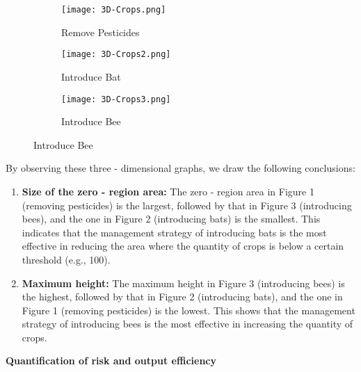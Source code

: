 \documentclass[12pt]{article}  %
\begin{document}
\begin{figure}[h]
    \centering
    \begin{subfigure}{.3\textwidth}
        \texttt{[image: 3D-Crops.png]}
        \caption{Remove Pesticides}
    \end{subfigure}
    \begin{subfigure}{.3\textwidth}
        \texttt{[image: 3D-Crops2.png]}
        \caption{Introduce Bat}
    \end{subfigure}
    \begin{subfigure}{.3\textwidth}
        \texttt{[image: 3D-Crops3.png]}
        \caption{Introduce Bee}
    \end{subfigure}
\end{figure}
By observing these three - dimensional graphs, we draw the following conclusions:

\begin{enumerate}
    \item \textbf{Size of the zero - region area:} The zero - region area in Figure 1 (removing pesticides) is the largest, followed by that in Figure 3 (introducing bees), and the one in Figure 2 (introducing bats) is the smallest. This indicates that the management strategy of introducing bats is the most effective in reducing the area where the quantity of crops is below a certain threshold (e.g., 100).

    \item \textbf{Maximum height:} The maximum height in Figure 3 (introducing bees) is the highest, followed by that in Figure 2 (introducing bats), and the one in Figure 1 (removing pesticides) is the lowest. This shows that the management strategy of introducing bees is the most effective in increasing the quantity of crops.
    
\end{enumerate}

\noindent\textbf{Quantification of risk and output efficiency}
\end{document}
